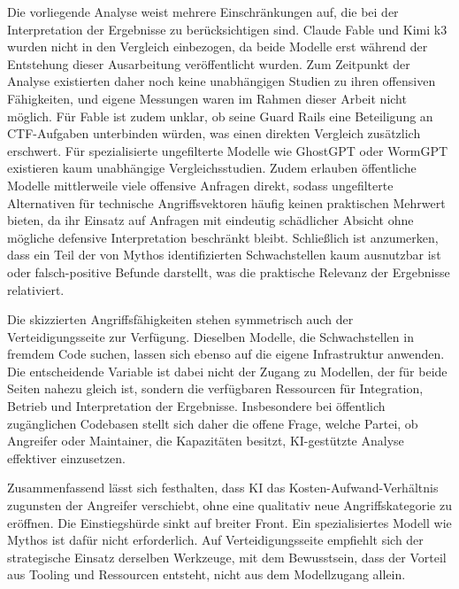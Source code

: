 Die vorliegende Analyse weist mehrere Einschränkungen auf, die bei der Interpretation der Ergebnisse zu berücksichtigen sind. Claude Fable und Kimi k3 wurden nicht in den Vergleich einbezogen, da beide Modelle erst während der Entstehung dieser Ausarbeitung veröffentlicht wurden. Zum Zeitpunkt der Analyse existierten daher noch keine unabhängigen Studien zu ihren offensiven Fähigkeiten, und eigene Messungen waren im Rahmen dieser Arbeit nicht möglich. Für Fable ist zudem unklar, ob seine Guard Rails eine Beteiligung an CTF-Aufgaben unterbinden würden, was einen direkten Vergleich zusätzlich erschwert. Für spezialisierte ungefilterte Modelle wie GhostGPT oder WormGPT existieren kaum unabhängige Vergleichsstudien. Zudem erlauben öffentliche Modelle mittlerweile viele offensive Anfragen direkt, sodass ungefilterte Alternativen für technische Angriffsvektoren häufig keinen praktischen Mehrwert bieten, da ihr Einsatz auf Anfragen mit eindeutig schädlicher Absicht ohne mögliche defensive Interpretation beschränkt bleibt. Schließlich ist anzumerken, dass ein Teil der von Mythos identifizierten Schwachstellen kaum ausnutzbar ist oder falsch-positive Befunde darstellt, was die praktische Relevanz der Ergebnisse relativiert.

Die skizzierten Angriffsfähigkeiten stehen symmetrisch auch der Verteidigungsseite zur Verfügung. Dieselben Modelle, die Schwachstellen in fremdem Code suchen, lassen sich ebenso auf die eigene Infrastruktur anwenden. Die entscheidende Variable ist dabei nicht der Zugang zu Modellen, der für beide Seiten nahezu gleich ist, sondern die verfügbaren Ressourcen für Integration, Betrieb und Interpretation der Ergebnisse. Insbesondere bei öffentlich zugänglichen Codebasen stellt sich daher die offene Frage, welche Partei, ob Angreifer oder Maintainer, die Kapazitäten besitzt, KI-gestützte Analyse effektiver einzusetzen.

Zusammenfassend lässt sich festhalten, dass KI das Kosten-Aufwand-Verhältnis zugunsten der Angreifer verschiebt, ohne eine qualitativ neue Angriffskategorie zu eröffnen. Die Einstiegshürde sinkt auf breiter Front. Ein spezialisiertes Modell wie Mythos ist dafür nicht erforderlich. Auf Verteidigungsseite empfiehlt sich der strategische Einsatz derselben Werkzeuge, mit dem Bewusstsein, dass der Vorteil aus Tooling und Ressourcen entsteht, nicht aus dem Modellzugang allein.
